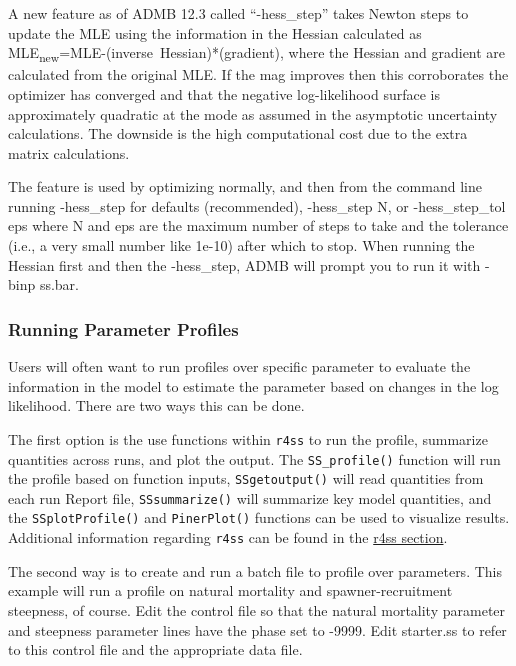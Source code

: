 A new feature as of ADMB 12.3 called ``-hess\_step'' takes Newton steps to update the MLE using the information in the Hessian calculated as MLE\textsubscript{new}=MLE-(inverse~Hessian)*(gradient), where the Hessian and gradient are calculated from the original MLE. If the mag improves then this corroborates the optimizer has converged and that the negative log-likelihood surface is approximately quadratic at the mode as assumed in the asymptotic uncertainty calculations. The downside is the high computational cost due to the extra matrix calculations.

The feature is used by optimizing normally, and then from the command line running -hess\_step for defaults (recommended), -hess\_step N, or -hess\_step\_tol eps where N and eps are the maximum number of steps to take and the tolerance (i.e., a very small number like 1e-10) after which to stop. When running the Hessian first and then the -hess\_step, ADMB will prompt you to run it with -binp ss.bar.


\subsubsection{Running Parameter Profiles}
Users will often want to run profiles over specific parameter to evaluate the information in the model to estimate the parameter based on changes in the log likelihood.  There are two ways this can be done.

The first option is the use functions within \texttt{r4ss} to run the profile, summarize quantities across runs, and plot the output.  The \texttt{SS\_profile()} function will run the profile based on function inputs, \texttt{SSgetoutput()} will read quantities from each run Report file, \texttt{SSsummarize()} will summarize key model quantities, and the \texttt{SSplotProfile()} and \texttt{PinerPlot()} functions can be used to visualize results.  Additional information regarding \texttt{r4ss} can be found in the \hyperref[sec:r4ss]{r4ss section}. 

The second way is to create and run a batch file to profile over parameters. This example will run a profile on natural mortality and spawner-recruitment steepness, of course.  Edit the control file so that the natural mortality parameter and steepness parameter lines have the phase set to -9999.  Edit starter.ss to refer to this control file and the appropriate data file.

